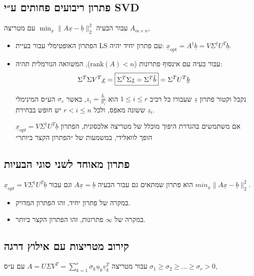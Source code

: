 \documentclass[11pt]{article}
\begin{document}
\subsection{פתרון ריבועים פחותים ע״י SVD}
\label{sec:orgbaa7cdf}
עבור הבעיה \(\min_{\underline{x}}\|A\underline{x}-\underline{b}\|_2^2\) עם מטריצה \(A_{m \times n}\),

\begin{itemize}
\item הפתרון האופטימלי עבור בעיית LS עם פתרון יחיד יהיה: \(\underline{x}_{\text{opt}} = A^{\dagger}\underline{b} = V\Sigma^{\dagger}U^T\underline{b}\).

\item עבור בעיה עם אינסוף פתרונות (\(\text{rank} \left( A \right) < n\)), המשוואה הנורמלית תהיה:
\[
    \Sigma^T\Sigma V^T\underline{x}
    =
    \fbox{$\Sigma^T\Sigma \underline{z}
    =
    \Sigma^T \hat{b}$}
    =
    \Sigma^TU^T\underline{b}
  \]

נקבל וקטור פתרון \(\underline{z}\) שעבורו כל רכיב \(1 \le i \le r\) הוא \(z_i = \frac{\hat{b}_i}{\sigma_i}\), כאשר \(\sigma_r\) הע״ס המינימלי ששונה מאפס, ולכל \(r < i \le n\) יש חופש בבחירת \(z_{i}\).

אם משתמשים בהגדרת היפוך מוכלל של מטריצה אלכסונית, הפתרון \(\underline{x}_{opt}=V\Sigma^{\dagger}U^T\underline{b}\) הופך לוואלידי, במשמעות של ״הפתרון הקצר ביותר״
\end{itemize}

\subsection{פתרון מאוחד לשני סוגי הבעיות}
\label{sec:org7a09e78}
\(\underline{x}_{opt}=V\Sigma^{\dagger}U^T\underline{b}\) הוא פתרון שמתאים גם עבור הבעיה \(A\underline{x}=\underline{b}\) וגם עבור \(min_{\underline{x}}\|A\underline{x}-\underline{b}\|_2^2\).

\begin{itemize}
\item במקרה של פתרון יחיד, זהו הפתרון המדויק.
\item במקרה של \(\infty\) פתרונות, זהו הפתרון הקצר ביותר.
\end{itemize}

\subsection{קירוב מטריצות עם אילוץ דרגה}
\label{sec:orgf7a60ec}
עבור מטריצה \(A = U \Sigma V^T = \sum_{k=1}^{r}\sigma_k \underline{u}_k \underline{v}_k^T\) עם ע״ס \(\sigma_1 \ge \sigma_2 \ge \ldots \ge \sigma_r > 0\),
\end{document}
